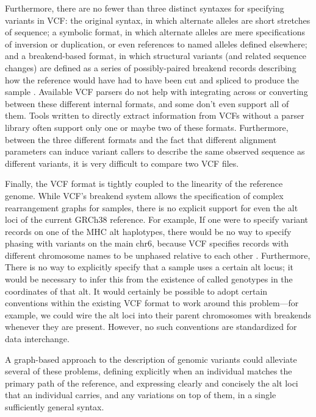\documentclass[11pt,proposal]{ucthesis}
\begin{document}
Furthermore, there are no fewer than three distinct syntaxes for specifying variants in VCF: the original syntax, in which alternate alleles are short stretches of sequence; a symbolic format, in which alternate alleles are mere specifications of inversion or duplication, or even references to named alleles defined elsewhere; and a breakend-based format, in which structural variants (and related sequence changes) are defined as a series of possibly-paired breakend records describing how the reference would have had to have been cut and spliced to produce the sample \cite{marshall2013variant}. Available VCF parsers do not help with integrating across or converting between these different internal formats, and some don't even support all of them. Tools written to directly extract information from VCFs without a parser library often support only one or maybe two of these formats. Furthermore, between the three different formats and the fact that different alignment parameters can induce variant callers to describe the same observed sequence as different variants, it is very difficult to compare two VCF files.

Finally, the VCF format is tightly coupled to the linearity of the reference genome. While VCF's breakend system allows the specification of complex rearrangement graphs for samples, there is no explicit support for even the alt loci of the current GRCh38 reference. For example, If one were to specify variant records on one of the MHC alt haplotypes, there would be no way to specify phasing with variants on the main chr6, because VCF specifies records with different chromosome names to be unphased relative to each other \cite{marshall2013variant}. Furthermore, There is no way to explicitly specify that a sample uses a certain alt locus; it would be necessary to infer this from the existence of called genotypes in the coordinates of that alt. It would certainly be possible to adopt certain conventions within the existing VCF format to work around this problem---for example, we could wire the alt loci into their parent chromosomes with breakends whenever they are present. However, no such conventions are standardized for data interchange.

A graph-based approach to the description of genomic variants could alleviate several of these problems, defining explicitly when an individual matches the primary path of the reference, and expressing clearly and concisely the alt loci that an individual carries, and any variations on top of them, in a single sufficiently general syntax.
\end{document}
